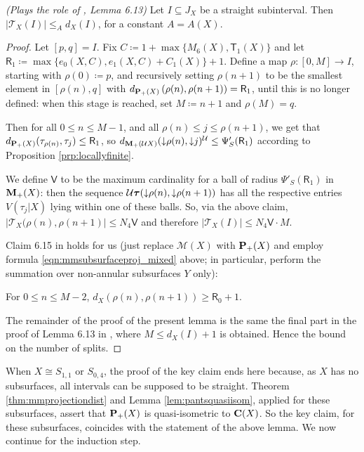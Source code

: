 \begin{lemma}\label{lem:mms613}\emph{(Plays the role of \cite{mms}, Lemma 6.13)}
Let $I\subseteq J_X$ be a straight subinterval. Then $|\mathcal T_X(I)|\leq_A d_X(I)$, for a constant $A=A(X)$.
\end{lemma}
\begin{proof}
Let $[p,q]=I$. Fix $C\coloneqq 1+\max \{M_6(X),\mathsf{T}_1(X)\}$ and let\linebreak $\mathsf{R}_1\coloneqq \max\{e_0(X,C),e_1(X,C)+C_1(X)\}+1$. Define a map $\rho:[0,M]\rightarrow I$, starting with $\rho(0)\coloneqq p$, and recursively setting $\rho(n+1)$ to be the smallest element in $[\rho(n),q]$ with $d_{{\mathbf{P}_+}(X)}\left(\rho(n),\rho(n+1)\right)=\mathsf{R}_1$, until this is no longer defined: when this stage is reached, set $M\coloneqq n+1$ and $\rho(M)=q$.

Then for all $0\leq n \leq M-1$, and all $\rho(n)\leq j\leq \rho(n+1)$, we get that $d_{{\mathbf{P}_+}(X)}(\tau_{\rho(n)},\tau_j)\leq \mathsf{R}_1$, so $d_{{\mathbf{M}_+}({\mathcal U} X)}(\mathord{\downarrow} \rho(n), \mathord{\downarrow} j)^{\mathcal U} \leq \Psi'_S(\mathsf R_1)$ according to Proposition \ref{prp:locallyfinite}.

We define $\mathsf V$ to be the maximum cardinality for a ball of radius $\Psi'_S(\mathsf R_1)$ in ${\mathbf{M}_+}(X)$: then the sequence ${\mathcal U}\bm\tau(\mathord{\downarrow}\rho(n),\mathord{\downarrow}\rho(n+1))$ has all the respective entries $V(\tau_j|X)$ lying within one of these balls. So, via the above claim, $|\mathcal T_X(\rho(n),\rho(n+1)|\leq N_4\mathsf V$ and therefore $|\mathcal T_X(I)|\leq N_4 \mathsf V \cdot M$.

Claim 6.15 in \cite{mms} holds for us (just replace $\mathcal M(X)$ with ${\mathbf{P}_+}(X)$ and employ formula \ref{eqn:mmsubsurfaceproj_mixed} above; in particular, perform the summation over non-annular subsurfaces $Y$ only):
\begin{claim}
For $0\leq n\leq M-2$, $d_X\left(\rho(n),\rho(n+1)\right)\geq \mathsf{R}_0+1$.
\end{claim}

The remainder of the proof of the present lemma is the same the final part in the proof of Lemma 6.13 in \cite{mms}, where $M \leq d_X(I)+1$ is obtained. Hence the bound on the number of splits.
\end{proof}

When $X\cong S_{1,1}$ or $S_{0,4}$, the proof of the key claim ends here because, as $X$ has no subsurfaces, all intervals can be supposed to be straight. Theorem \ref{thm:mmprojectiondist} and Lemma \ref{lem:pantsquasiisom}, applied for these subsurfaces, assert that ${\mathbf{P}_+}(X)$ is quasi-isometric to $\mathbf C(X)$. So the key claim, for these subsurfaces, coincides with the statement of the above lemma. We now continue for the induction step.

